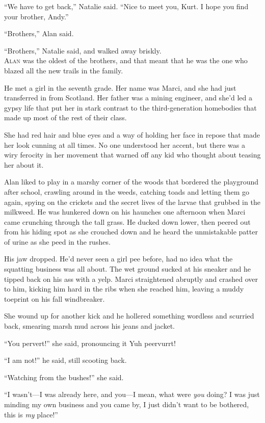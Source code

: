 \documentclass{article}
\begin{document}
``We have to get back,'' Natalie said.  ``Nice to meet you, Kurt.  I
hope you find your brother, Andy.''

``Brothers,'' Alan said.

``Brothers,'' Natalie said, and walked away briskly.
\\
\lettrine[lines=3, lhang=.5, nindent=0pt, findent=2pt]{A}{lan} was the oldest of the brothers, and that meant that he was the
one who blazed all the new trails in the family.

He met a girl in the seventh grade.  Her name was Marci, and she had
just transferred in from Scotland.  Her father was a mining engineer,
and she'd led a gypsy life that put her in stark contrast to the
third-generation homebodies that made up most of the rest of their
class.

She had red hair and blue eyes and a way of holding her face in repose
that made her look cunning at all times.  No one understood her
accent, but there was a wiry ferocity in her movement that warned off
any kid who thought about teasing her about it.

Alan liked to play in a marshy corner of the woods that bordered the
playground after school, crawling around in the weeds, catching toads
and letting them go again, spying on the crickets and the secret lives
of the larvae that grubbed in the milkweed.  He was hunkered down on
his haunches one afternoon when Marci came crunching through the tall
grass.  He ducked down lower, then peered out from his hiding spot as
she crouched down and he heard the unmistakable patter of urine as she
peed in the rushes.

His jaw dropped.  He'd never seen a girl pee before, had no idea what
the squatting business was all about.  The wet ground sucked at his
sneaker and he tipped back on his ass with a yelp.  Marci straightened
abruptly and crashed over to him, kicking him hard in the ribs when
she reached him, leaving a muddy toeprint on his fall windbreaker.

She wound up for another kick and he hollered something wordless and
scurried back, smearing marsh mud across his jeans and jacket.

``You pervert!'' she said, pronouncing it Yuh peervurrt!

``I am not!'' he said, still scooting back.

``Watching from the bushes!'' she said.

``I wasn't---I was already here, and you---I mean, what were
\textit{you} doing?  I was just minding my own business and you came
by, I just didn't want to be bothered, this is \textit{my} place!''
\end{document}
